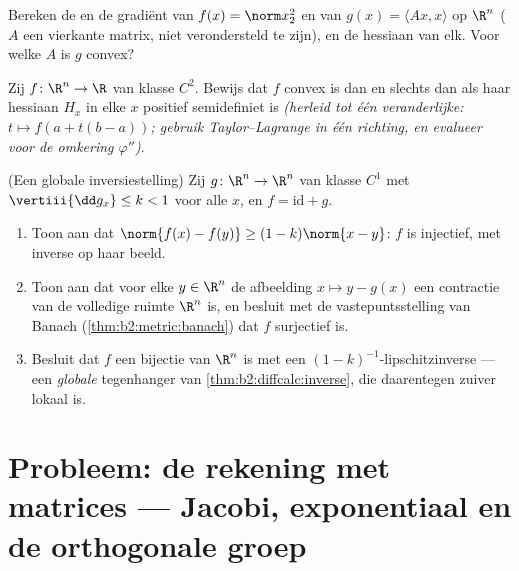\begin{exercise}[$\star$]\label{exo:b2:diffcalc:10}
Bereken de  en de gradiënt van $f(x) = \norm x_2^2$ en
van $g(x) = \langle Ax, x\rangle$ op $\R^n$ ($A$ een vierkante
matrix, niet verondersteld  te zijn), en de hessiaan van
elk. Voor welke $A$ is $g$ convex?
\end{exercise}

\begin{exercise}[$\star\star$]\label{exo:b2:diffcalc:11}
Zij $f \colon \R^n \to \R$ van klasse $C^2$. Bewijs dat $f$ convex
is dan en slechts dan als haar hessiaan $H_x$ in elke $x$ positief
semidefiniet is \emph{(herleid tot één veranderlijke: $t \mapsto
f(a + t(b-a))$; gebruik Taylor--Lagrange in één richting, en
evalueer voor de omkering $\varphi''$)}.
\end{exercise}

\begin{exercise}[$\star\star\star$]\label{exo:b2:diffcalc:12}
(Een globale inversiestelling) Zij $g \colon \R^n \to \R^n$ van
klasse $C^1$ met $\vertiii{\dd g_x} \leq k < 1$ voor alle $x$, en
$f = \mathrm{id} + g$.
\begin{enumerate}
  \item Toon aan dat $\norm{f(x) - f(y)} \geq (1 - k)\norm{x -
        y}$: $f$ is injectief, met  inverse op haar beeld.
  \item Toon aan dat voor elke $y \in \R^n$ de afbeelding $x
        \mapsto y - g(x)$ een contractie van de volledige ruimte
        $\R^n$ is, en besluit met de vastepuntsstelling van Banach
        (\cref{thm:b2:metric:banach}) dat $f$ surjectief is.
  \item Besluit dat $f$ een bijectie van $\R^n$ is met een
        $(1-k)^{-1}$-lipschitzinverse --- een \emph{globale}
        tegenhanger van \cref{thm:b2:diffcalc:inverse}, die
        daarentegen zuiver lokaal is.
\end{enumerate}
\end{exercise}

\section{Probleem: de rekening met matrices --- Jacobi, exponentiaal
en de orthogonale groep}

